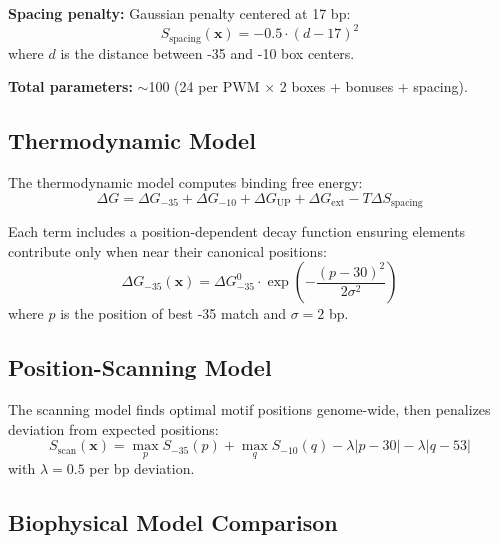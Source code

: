\documentclass{article}
\begin{document}
\textbf{Spacing penalty:} Gaussian penalty centered at 17 bp:
\begin{equation}
S_{\text{spacing}}(\mathbf{x}) = -0.5 \cdot (d - 17)^2
\end{equation}
where $d$ is the distance between -35 and -10 box centers.

\textbf{Total parameters:} $\sim$100 (24 per PWM $\times$ 2 boxes + bonuses + spacing).

\subsection{Thermodynamic Model}

The thermodynamic model computes binding free energy:
\begin{equation}
\Delta G = \Delta G_{-35} + \Delta G_{-10} + \Delta G_{\text{UP}} + \Delta G_{\text{ext}} - T\Delta S_{\text{spacing}}
\end{equation}

Each term includes a position-dependent decay function ensuring elements contribute only when near their canonical positions:
\begin{equation}
\Delta G_{-35}(\mathbf{x}) = \Delta G^0_{-35} \cdot \exp\left(-\frac{(p - 30)^2}{2\sigma^2}\right)
\end{equation}
where $p$ is the position of best -35 match and $\sigma = 2$ bp.

\subsection{Position-Scanning Model}

The scanning model finds optimal motif positions genome-wide, then penalizes deviation from expected positions:
\begin{equation}
S_{\text{scan}}(\mathbf{x}) = \max_p S_{-35}(p) + \max_q S_{-10}(q) - \lambda |p - 30| - \lambda |q - 53|
\end{equation}
with $\lambda = 0.5$ per bp deviation.

\subsection{Biophysical Model Comparison}
\end{document}

